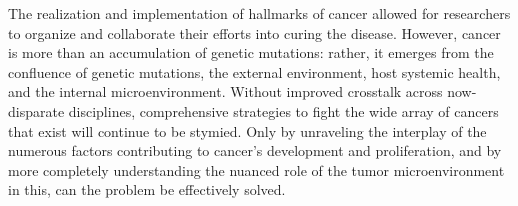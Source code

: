 \documentclass[11pt,letterpaper,final] {article}
\begin{document}
The realization and implementation of hallmarks of cancer allowed for researchers to organize and collaborate their efforts into curing the disease. However, cancer is more than an accumulation of genetic mutations: rather, it emerges from the confluence of genetic mutations, the external environment, host systemic health, and the internal microenvironment. Without improved crosstalk across now-disparate disciplines, comprehensive strategies to fight the wide array of cancers that exist will continue to be stymied. Only by unraveling the interplay of the numerous factors contributing to cancer's development and proliferation, and by more completely understanding the nuanced role of the tumor microenvironment in this, can the problem be effectively solved.
\end{document}
